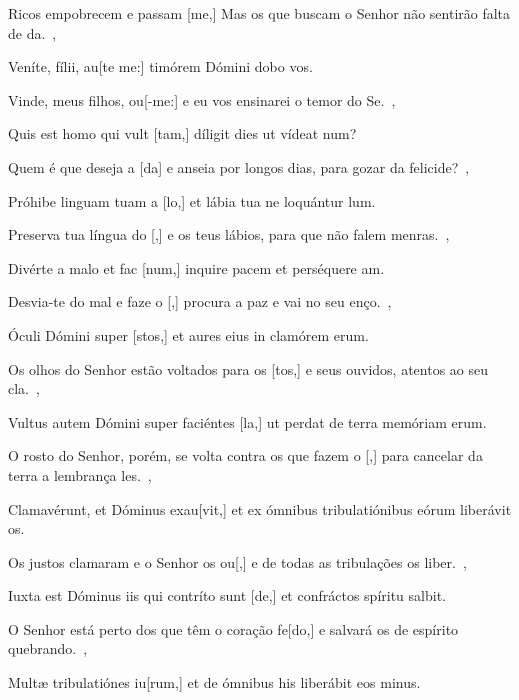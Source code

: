 {    {Ricos empobrecem e passam [me,] Mas os que buscam o Senhor não sentirão falta de da.~\Antiphona},
  {\item {}Veníte, fílii, au[te me:] timórem Dómini dobo vos.~\Antiphona}%
    {Vinde, meus filhos, ou[-me:] e eu vos ensinarei o temor do Se.~\Antiphona},
  {\item {}Quis est homo qui vult [tam,] díligit dies ut vídeat \-num?~\Antiphona}%
    {Quem é que deseja a [da] e anseia por longos dias, para gozar da felicide?~\Antiphona},
  {\item {}Próhibe linguam tuam a [lo,] et lábia tua ne lo\-quántur \-lum.~\Antiphona}%
    {Preserva tua língua do [,] e os teus lábios, para que não falem menras.~\Antiphona},
  {\item {}Divérte a malo et fac [num,] inquire pacem et perséquere am.~\Antiphona}%
    {Desvia-te do mal e faze o [,] procura a paz e vai no seu enço.~\Antiphona},
  {\item {}Óculi Dómini super [stos,] et aures eius in clamórem erum.~\Antiphona}%
    {Os olhos do Senhor estão voltados para os [tos,] e seus ouvidos, atentos ao seu cla.~\Antiphona},
  {\item {}Vultus autem Dómini super faciéntes [la,] ut perdat de ter\-ra memóriam erum.~\Antiphona}%
    {O rosto do Senhor, porém, se volta contra os que fazem o [,] para cancelar da terra a lembrança les.~\Antiphona},
  {\item {}Clamavérunt, et Dóminus exau[vit,] et ex ómnibus tribulatiónibus eórum liberávit os.~\Antiphona}%
    {Os justos clamaram e o Senhor os ou[,] e de todas as tribulações os liber.~\Antiphona},
  {\item {}Iuxta est Dóminus iis qui contríto sunt [de,] et confráctos spíritu salbit.~\Antiphona}%
    {O Senhor está perto dos que têm o coração fe[do,] e salvará os de espírito quebrando.~\Antiphona},
  {\item {}Multæ tribulatiónes iu[rum,] et de ómnibus his liberábit eos minus.~\Antiphona}%
}
